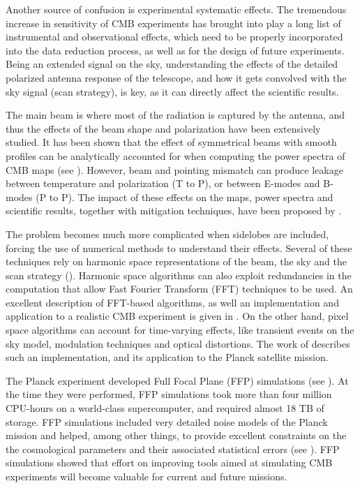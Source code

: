 \documentclass[a4paper,11pt]{article}
\begin{document}
Another source of confusion is experimental systematic effects. The tremendous increase in sensitivity of CMB experiments has brought into play a long list of instrumental and observational effects, which need to be properly incorporated into the data reduction process, as well as for the design of future experiments. Being an extended signal on the sky, understanding the effects of the detailed polarized antenna response of the telescope, and how it gets convolved with the sky signal (scan strategy), is key, as it can directly affect the scientific results.

The main beam is where most of the radiation is captured by the antenna, and thus the effects of the beam shape and polarization have been extensively studied. 
It has been shown that the effect of symmetrical beams with smooth profiles can be analytically accounted for when computing the power spectra of CMB maps (see \cite{2003ApJS..148...39P}).
However, beam and pointing mismatch can produce leakage between temperature and polarization (T to P), or between E-modes and B-modes (P to P). The impact of these effects on the maps, power spectra and scientific results, together with mitigation techniques, have been proposed by \cite{PhysRevD.77.083003, 2007MNRAS.376.1767O, 2015JCAP...03..048D}.

The problem becomes much more complicated when sidelobes are included, forcing the use of numerical methods to understand their effects.
Several of these techniques rely on harmonic space representations of the beam, the sky and the scan strategy (\cite{2001PhRvD..63l3002W,2000PhRvD..62l3002C}). Harmonic space algorithms can also exploit redundancies in the computation that allow Fast Fourier Transform (FFT) techniques to be used. An excellent description of FFT-based algorithms, as well an implementation and application to a realistic CMB experiment is given in \cite{2018arXiv180905034D}. On the other hand, pixel space algorithms can account for time-varying effects, like transient events on the sky model, modulation techniques and optical distortions. The work of \cite{2011ApJS..193....5M} describes such an implementation, and its application to the Planck satellite mission.

The Planck experiment developed Full Focal Plane (FFP) simulations (see \cite{2016A&A...594A..12P}). At the time they were performed, FFP simulations took more than four million CPU-hours on a world-class supercomputer, and required almost 18 TB of storage. FFP simulations included very detailed noise models of the Planck mission and helped, among other things, to provide excellent constraints on the the cosmological parameters and their associated statistical errors (see \cite{2016A&A...594A..13P}). FFP simulations showed that effort on improving tools aimed at simulating CMB experiments will become valuable for current and future missions.
\end{document}
